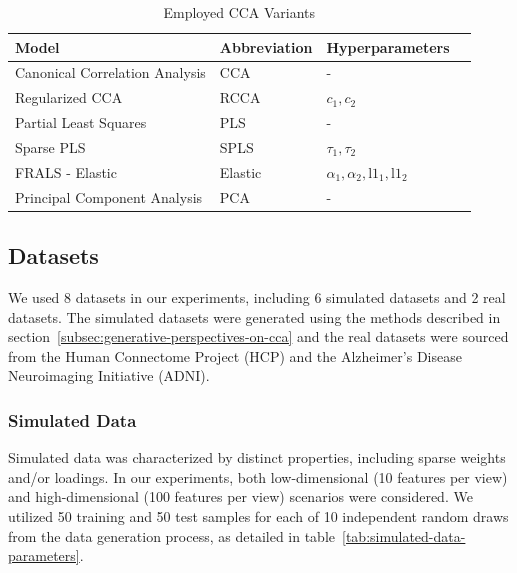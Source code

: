 \begin{table}[h]
\centering
\caption{Employed CCA Variants}
\begin{tabular}{|l|l|l|l|}
\hline
\textbf{Model} & \textbf{Abbreviation} & \textbf{Hyperparameters}  \\
\hline
Canonical Correlation Analysis & CCA & -   \\
\hline
Regularized CCA & RCCA & \(c_1, c_2\)   \\
\hline
Partial Least Squares & PLS & -   \\
\hline
Sparse PLS & SPLS & \(\tau_1, \tau_2\)   \\
\hline
FRALS - Elastic & Elastic & \(\alpha_1, \alpha_2, \text{l1}_1, \text{l1}_2\)   \\
\hline
Principal Component Analysis & PCA & -  \\
\hline
\end{tabular}
\end{table}

\subsection{Datasets}

We used 8 datasets in our experiments, including 6 simulated datasets and 2 real datasets.
The simulated datasets were generated using the methods described in section~\ref{subsec:generative-perspectives-on-cca} and the real datasets were sourced from the Human Connectome Project (HCP) and the Alzheimer's Disease Neuroimaging Initiative (ADNI).

\subsubsection{Simulated Data}

Simulated data was characterized by distinct properties, including sparse weights and/or loadings.
In our experiments, both low-dimensional (10 features per view) and high-dimensional (100 features per view) scenarios were considered.
We utilized 50 training and 50 test samples for each of 10 independent random draws from the data generation process, as detailed in table~\ref{tab:simulated-data-parameters}.

